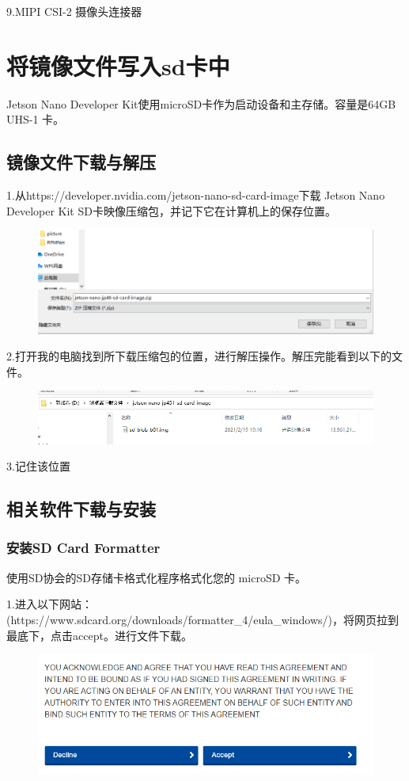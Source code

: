 \documentclass[openbib]{article}
\begin{document}
9.MIPI CSI-2 摄像头连接器
\section{将镜像文件写入sd卡中}
Jetson Nano Developer Kit使用microSD卡作为启动设备和主存储。容量是64GB UHS-1 卡。
\subsection{镜像文件下载与解压}
1.从https://developer.nvidia.com/jetson-nano-sd-card-image下载 Jetson Nano Developer Kit SD卡映像压缩包，并记下它在计算机上的保存位置。
\begin{figure}[htbp]
	\centering
	\includegraphics[scale=0.4]{image}
\end{figure}

2.打开我的电脑找到所下载压缩包的位置，进行解压操作。解压完能看到以下的文件。
\begin{figure}[htbp]
	\centering
	\includegraphics[scale=0.4]{a1}
\end{figure}

3.记住该位置
\subsection{相关软件下载与安装}
\subsubsection{安装SD Card Formatter}
使用SD协会的SD存储卡格式化程序格式化您的 microSD 卡。

1.进入以下网站：(https://www.sdcard.org/downloads/formatter\_4/eula\_windows/)，将网页拉到最底下，点击accept。进行文件下载。
\begin{figure}[htbp]
	\centering
	\includegraphics[scale=0.3]{a2}
\end{figure}
\end{document}
